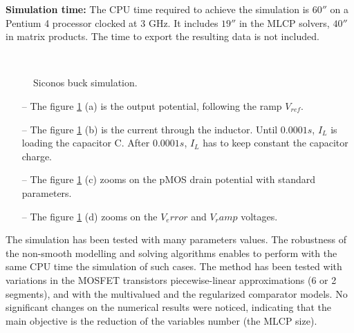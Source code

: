 {\bf Simulation time:} The CPU time required to achieve the simulation is $60 \second$ on a
Pentium 4 processor clocked at 3 GHz. It includes $19 \second$ in the MLCP solvers, $40 \second$ in
matrix products. The time to export the resulting data is not included.


\begin{figure}[!ht]
  \subfigure[$V_{load}$ ]{\label{fig:SICONOS_SIMU_BUCK_VLOAD}
        \resizebox{0.5\linewidth}{!}{}
  }\hspace{-2mm}
  \subfigure[$I_L$]  
  {\label{fig:SICONOS_SIMU_BUCK_IL} 
        \resizebox{0.5\linewidth}{!}{}
  } \\
  \hspace{-2mm}
 \caption{{\sc Siconos} buck simulation.}
\label{fig:figSimuBuck}
\end{figure}


\begin{enumerate}
  \item[--] The figure \ref{fig:figSimuBuck} (a) is the output potential, following the ramp $V_{ref}$.
    \item[--] The figure \ref{fig:figSimuBuck} (b) is the current through the inductor. Until $0.0001s$, $I_L$
    is loading the capacitor C. After $0.0001s$, $I_L$ has to keep constant the capacitor charge.
    \item[--] The figure \ref{fig:figSimuBuck} (c) zooms on the pMOS drain potential with standard
    parameters.
    \item[--] The figure  \ref{fig:figSimuBuck} (d) zooms on the $V_error$ and $V_ramp$ voltages.


  \end{enumerate}

The simulation has been tested with many parameters values. The robustness of the non-smooth modelling and solving algorithms enables to perform with the same CPU time the simulation of such cases. The method has been tested with variations in the MOSFET transistors piecewise-linear approximations (6 or 2 segments), and with the multivalued and the regularized comparator models. No significant changes on the numerical results were noticed, indicating that the main objective is the reduction of the variables number (the MLCP size).  



